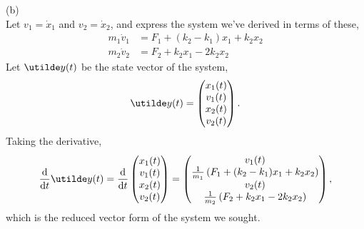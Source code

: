\documentclass[a4paper, 11pt]{report}
\begin{document}
\sol (b) \\
Let $v_1 = \dot{x}_1$ and $v_2 = \dot{x}_2$, and express the system we've derived in terms of these,
\begin{align*}
  m_1\dot{v}_1 &= F_1 + (k_2 - k_1)x_1 + k_2x_2 \\ 
  m_2\dot{v}_2 &= F_2 + k_2x_1 - 2k_2x_2
\end{align*}
Let $\ut{y}(t)$ be the state vector of the system,
$$
  \ut{y}(t) = \begin{pmatrix} x_1(t) \\ v_1(t) \\ x_2(t) \\ v_2(t) \end{pmatrix}.
$$
Taking the derivative,
$$
  \dd{t}\ut{y}(t) = \dd{t}\begin{pmatrix} x_1(t) \\ v_1(t) \\ x_2(t) \\ v_2(t) \end{pmatrix} = \begin{pmatrix} v_1(t) \\ \frac{1}{m_1}\bracks{F_1 + (k_2 - k_1)x_1 + k_2x_2} \\ v_2(t) \\ \frac{1}{m_2}\bracks{F_2 + k_2x_1 - 2k_2x_2} \end{pmatrix},
$$
which is the reduced vector form of the system we sought. \\
\end{document}
